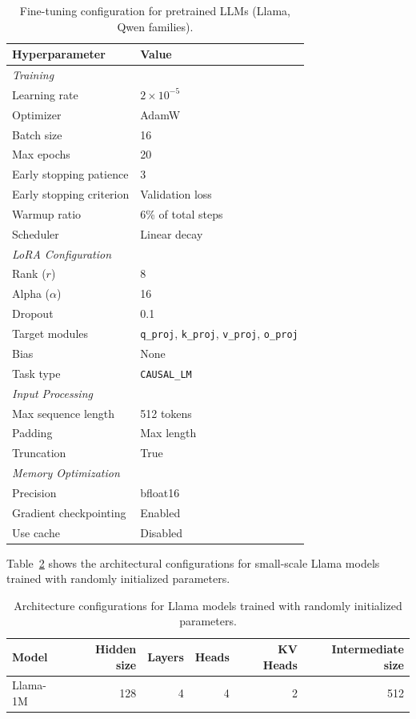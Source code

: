\documentclass{article}
\theoremstyle{plain}
\theoremstyle{definition}
\theoremstyle{remark}
\begin{document}
\begin{table}[h]
\centering
\caption{Fine-tuning configuration for pretrained LLMs (Llama, Qwen families).}
\label{tab:llm_config}
\begin{tabular}{ll}
\toprule
Hyperparameter & Value \\
\midrule
\multicolumn{2}{l}{\textit{Training}} \\
Learning rate & $2 \times 10^{-5}$ \\
Optimizer & AdamW \\
Batch size & 16 \\
Max epochs & 20 \\
Early stopping patience & 3 \\
Early stopping criterion & Validation loss \\
Warmup ratio & 6\% of total steps \\
Scheduler & Linear decay \\
\midrule
\multicolumn{2}{l}{\textit{LoRA Configuration}} \\
Rank ($r$) & 8 \\
Alpha ($\alpha$) & 16 \\
Dropout & 0.1 \\
Target modules & \texttt{q\_proj}, \texttt{k\_proj}, \texttt{v\_proj}, \texttt{o\_proj} \\
Bias & None \\
Task type & \texttt{CAUSAL\_LM} \\
\midrule
\multicolumn{2}{l}{\textit{Input Processing}} \\
Max sequence length & 512 tokens \\
Padding & Max length \\
Truncation & True \\
\midrule
\multicolumn{2}{l}{\textit{Memory Optimization}} \\
Precision & bfloat16 \\
Gradient checkpointing & Enabled \\
Use cache & Disabled \\
\bottomrule
\end{tabular}
\end{table}

Table~\ref{tab:tiny_llm_config} shows the architectural configurations for small-scale Llama models trained with randomly initialized parameters.

\begin{table}[h]
\centering
\caption{Architecture configurations for Llama models trained with randomly initialized parameters.}
\label{tab:tiny_llm_config}
\begin{tabular}{lrrrrr}
\toprule
Model & Hidden size & Layers & Heads & KV Heads & Intermediate size \\
\midrule
Llama-1M & 128 & 4 & 4 & 2 & 512 \\
\bottomrule
\end{tabular}
\end{table}
\end{document}
